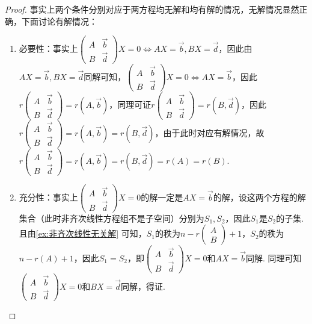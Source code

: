 \begin{proof}
    事实上两个条件分别对应于两方程均无解和均有解的情况，无解情况显然正确，下面讨论有解情况：
    \begin{enumerate}
        \item 必要性：事实上$\begin{pmatrix}
                      A & \vec{b} \\ B & \vec{d}
                  \end{pmatrix}X=0\iff AX=\vec{b},BX=\vec{d}$，因此由$AX=\vec{b},BX=\vec{d}$同解可知，$\begin{pmatrix}
                      A & \vec{b} \\ B & \vec{d}
                  \end{pmatrix}X=0\iff AX=\vec{b}$，因此$r\begin{pmatrix}
                      A & \vec{b} \\ B & \vec{d}
                  \end{pmatrix}=r(A,\vec{b})$，同理可证$r\begin{pmatrix}
                      A & \vec{b} \\ B & \vec{d}
                  \end{pmatrix}=r(B,\vec{d})$，因此$r\begin{pmatrix}
                      A & \vec{b} \\ B & \vec{d}
                  \end{pmatrix}=r(A,\vec{b})=r(B,\vec{d})$，由于此时对应有解情况，故$r\begin{pmatrix}
                      A & \vec{b} \\ B & \vec{d}
                  \end{pmatrix}=r(A,\vec{b})=r(B,\vec{d})=r(A)=r(B)$.

        \item 充分性：事实上$\begin{pmatrix}
                      A & \vec{b} \\ B & \vec{d}
                  \end{pmatrix}X=0$的解一定是$AX=\vec{b}$的解，设这两个方程的解集合（此时非齐次线性方程组不是子空间）分别为$S_1,S_2$，因此$S_1$是$S_2$的子集. 且由\autoref{ex:非齐次线性无关解} 可知，$S_1$的秩为$n-r\begin{pmatrix}
                      A \\ B
                  \end{pmatrix}+1$，$S_2$的秩为$n-r(A)+1$，因此$S_1=S_2$，即$\begin{pmatrix}
                      A & \vec{b} \\ B & \vec{d}
                  \end{pmatrix}X=0$和$AX=\vec{b}$同解. 同理可知$\begin{pmatrix}
                      A & \vec{b} \\ B & \vec{d}
                  \end{pmatrix}X=0$和$BX=\vec{d}$同解，得证.
    \end{enumerate}
\end{proof}

